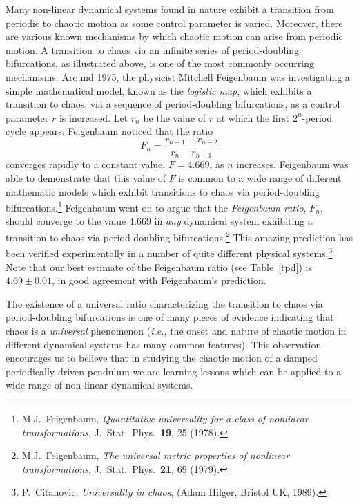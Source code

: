 Many non-linear dynamical systems found in nature exhibit a transition
from periodic to chaotic motion as some control parameter is varied.
Moreover, there are various known mechanisms by which chaotic motion can arise from periodic
motion. A transition to chaos via an infinite series of period-doubling bifurcations, as
illustrated
above, is one of the most commonly occurring mechanisms. 
Around 1975, the physicist Mitchell Feigenbaum was investigating a simple mathematical
model, known as the {\em logistic map}, which exhibits a transition to chaos,
via a sequence of period-doubling bifurcations, as a control parameter
$r$ is increased. Let $r_n$ be the value of $r$ at which the
first $2^n$-period cycle appears. Feigenbaum noticed that the ratio
\begin{equation}
F_n =\frac{r_{n-1}-r_{n-2}}{r_{n}-r_{n-1}}
\end{equation}
converges rapidly to a constant value, $F=4.669$, as $n$ increases. Feigenbaum was
able to demonstrate  that this value of $F$ is common to a wide range of different
mathematic models which exhibit transitions to chaos via period-doubling
bifurcations.\footnote{M.J.~Feigenbaum, {\em Quantitative universality for a
class of nonlinear transformations}, J.\ Stat.\ Phys.\ {\bf 19}, 25 (1978).}
Feigenbaum  went on to argue that the {\em Feigenbaum ratio}, $F_n$,
should converge to the value $4.669$ in {\em any} dynamical system exhibiting a
transition to chaos via period-doubling bifurcations.\footnote{M.J.~Feigenbaum, 
{\em The universal metric properties of nonlinear transformations}, 
J.\ Stat.\ Phys.\ {\bf 21}, 69 (1979).} This amazing prediction has
been verified experimentally in a number of quite different physical
systems.\footnote{P.~Citanovic, {\em Universality in chaos}, (Adam Hilger,
Bristol UK, 1989).} Note that our best estimate of the
Feigenbaum ratio (see Table~\ref{tpd}) is $4.69\pm 0.01$, in good agreement with Feigenbaum's
prediction.

The existence of a universal ratio characterizing the transition to chaos via
period-doubling bifurcations is one of many pieces of evidence indicating that
chaos is a {\em universal}\/ phenomenon ({\em i.e.}, the onset and nature
of chaotic motion in different dynamical systems has many common features). 
This observation encourages us to believe that in studying the chaotic motion of 
a damped periodically driven pendulum we are  learning lessons which can
be applied to a wide range of non-linear dynamical systems.

